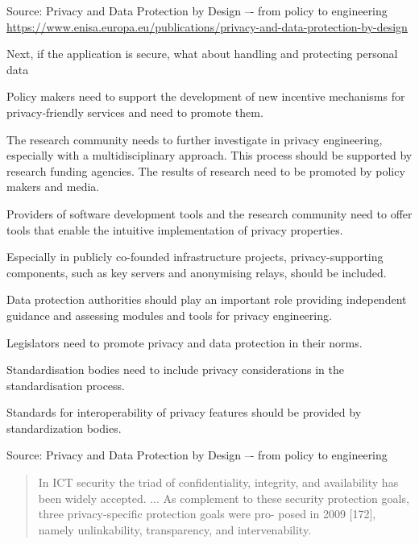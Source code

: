 \documentclass[Screen16to9,17pt]{foils}
\begin{document}
Source: Privacy and Data Protection by Design –- from policy to engineering\\
{\footnotesize\url{https://www.enisa.europa.eu/publications/privacy-and-data-protection-by-design}}

\begin{list2}
\item Next, if the application is secure, what about handling and protecting personal data
\end{list2}


\begin{list2}
\item {\small Policy makers need to support the development of new incentive mechanisms for privacy-friendly services and need to promote them.}
\item {\small The research community needs to further investigate in privacy engineering, especially with a
multidisciplinary approach. This process should be supported by research funding agencies.
The results of research need to be promoted by policy makers and media.}
\item {\small Providers of software development tools and the research community need to offer tools that
enable the intuitive implementation of privacy properties.}
\item {\small Especially in publicly co-founded infrastructure projects, privacy-supporting components,
such as key servers and anonymising relays, should be included.}
\item {\small Data protection authorities should play an important role providing independent guidance
and assessing modules and tools for privacy engineering.}
\item {\small Legislators need to promote privacy and data protection in their norms.}
\item {\small Standardisation bodies need to include privacy considerations in the standardisation process.}
\item {\small Standards for interoperability of privacy features should be provided by standardization bodies.}
\end{list2}

Source: Privacy and Data Protection by Design –- from policy to engineering\


\begin{quote}\small
In ICT
security the triad of confidentiality, integrity, and availability has been widely accepted. ...
As complement to these security protection goals, three privacy-specific protection goals were pro-
posed in 2009 [172], namely unlinkability, transparency, and intervenability.
\end{quote}
\end{document}

